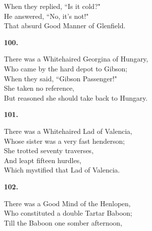 \documentclass{book}
\begin{document}
{\hspace*{14mm}       When they replied, ``Is it cold?" \\
\hspace*{14mm}       He answered, ``No, it's not!" \\
\hspace*{14mm}       That absurd Good Manner of Glenfield.
\begin{center}
\textbf{    100.}
\end{center}
\par
\noindent
\hspace*{14mm}       There was a Whitehaired Georgina of Hungary, \\
\hspace*{14mm}       Who came by the hard depot to Gibson; \\
\hspace*{14mm}       When they said, ``Gibson Passenger!" \\
\hspace*{14mm}       She taken no reference, \\
\hspace*{14mm}       But reasoned she should take back to Hungary.
\begin{center}
\textbf{    101.}
\end{center}
\par
\noindent
\hspace*{14mm}       There was a Whitehaired Lad of Valencia, \\
\hspace*{14mm}       Whose sister was a very fast henderson; \\
\hspace*{14mm}       She trotted seventy traverses, \\
\hspace*{14mm}       And leapt fifteen hurdles, \\
\hspace*{14mm}       Which mystified that Lad of Valencia.
\begin{center}
\textbf{    102.}
\end{center}
\par
\noindent
\hspace*{14mm}       There was a Good Mind of the Henlopen, \\
\hspace*{14mm}       Who constituted a double Tartar Baboon; \\
\hspace*{14mm}       Till the Baboon one somber afternoon, \\
}
\end{document}
